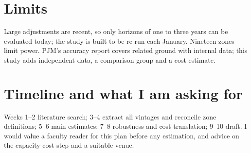 \documentclass[10pt,a4paper]{article}
\begin{document}
\section{Limits}
Large adjustments are recent, so only horizons of one to three years can be evaluated today; the study is built to be re-run each January. Nineteen zones limit power. PJM's accuracy report covers related ground with internal data; this study adds independent data, a comparison group and a cost estimate.

\section{Timeline and what I am asking for}
Weeks 1--2 literature search; 3--4 extract all vintages and reconcile zone definitions; 5--6 main estimates; 7--8 robustness and cost translation; 9--10 draft. I would value a faculty reader for this plan before any estimation, and advice on the capacity-cost step and a suitable venue.
\end{document}
